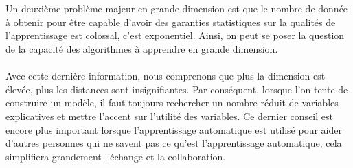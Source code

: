 \\
\\
Un deuxième problème majeur en grande dimension est que le nombre de donnée à obtenir pour être capable d’avoir des garanties statistiques sur la qualités de l’apprentissage est colossal, c’est exponentiel. Ainsi, on peut se poser la question de la capacité des algorithmes à apprendre en grande dimension.
\\
\\
Avec cette dernière information, nous comprenons que plus la dimension est élevée, plus les distances sont insignifiantes. Par conséquent, lorsque l'on tente de construire un modèle, il faut toujours rechercher un nombre réduit de variables explicatives et mettre l'accent sur l'utilité des variables. Ce dernier conseil est encore plus important lorsque l'apprentissage automatique est utilisé pour aider d'autres personnes qui ne savent pas ce qu'est l'apprentissage automatique, cela simplifiera grandement l'échange et la collaboration.
\\
\\





